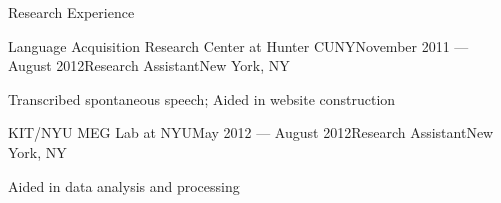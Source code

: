 \documentclass{resume} %
\begin{document}
\begin{rSection}{Research Experience}
\begin{rSubsection}{Language Acquisition Research Center at Hunter CUNY}{November 2011 --- August 2012}{Research Assistant}{New York, NY}
\item Transcribed spontaneous speech; Aided in website construction
\end{rSubsection}

\begin{rSubsection}{KIT/NYU MEG Lab at NYU}{May 2012 --- August 2012}{Research Assistant}{New York, NY}
\item Aided in data analysis and processing
\end{rSubsection}


\end{rSection}


\vspace{.25cm}
\end{document}
